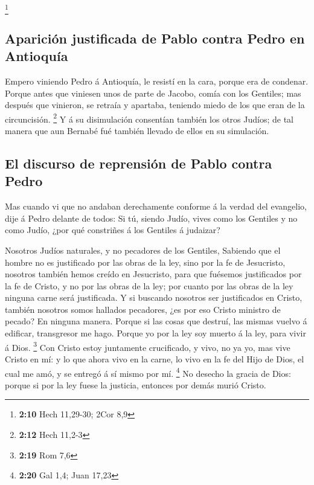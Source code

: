 \footnote{\textbf{2:10} Hech 11,29-30; 2Cor 8,9}

\hypertarget{apariciuxf3n-justificada-de-pablo-contra-pedro-en-antioquuxeda}{%
\subsection{Aparición justificada de Pablo contra Pedro en
Antioquía}\label{apariciuxf3n-justificada-de-pablo-contra-pedro-en-antioquuxeda}}

 Empero viniendo Pedro á Antioquía, le resistí en la cara,
porque era de condenar.  Porque antes que viniesen unos de
parte de Jacobo, comía con los Gentiles; mas después que vinieron, se
retraía y apartaba, teniendo miedo de los que eran de la circuncisión.
\footnote{\textbf{2:12} Hech 11,2-3}  Y á su disimulación
consentían también los otros Judíos; de tal manera que aun Bernabé fué
también llevado de ellos en su simulación.

\hypertarget{el-discurso-de-reprensiuxf3n-de-pablo-contra-pedro}{%
\subsection{El discurso de reprensión de Pablo contra
Pedro}\label{el-discurso-de-reprensiuxf3n-de-pablo-contra-pedro}}

 Mas cuando vi que no andaban derechamente conforme á la
verdad del evangelio, dije á Pedro delante de todos: Si tú, siendo
Judío, vives como los Gentiles y no como Judío, ¿por qué constriñes á
los Gentiles á judaizar?

 Nosotros Judíos naturales, y no pecadores de los Gentiles,
 Sabiendo que el hombre no es justificado por las obras de
la ley, sino por la fe de Jesucristo, nosotros también hemos creído en
Jesucristo, para que fuésemos justificados por la fe de Cristo, y no por
las obras de la ley; por cuanto por las obras de la ley ninguna carne
será justificada.  Y si buscando nosotros ser justificados
en Cristo, también nosotros somos hallados pecadores, ¿es por eso Cristo
ministro de pecado? En ninguna manera.  Porque si las cosas
que destruí, las mismas vuelvo á edificar, transgresor me hago.
 Porque yo por la ley soy muerto á la ley, para vivir á
Dios. \footnote{\textbf{2:19} Rom 7,6}  Con Cristo estoy
juntamente crucificado, y vivo, no ya yo, mas vive Cristo en mí: y lo
que ahora vivo en la carne, lo vivo en la fe del Hijo de Dios, el cual
me amó, y se entregó á sí mismo por mí. \footnote{\textbf{2:20} Gal 1,4;
  Juan 17,23}  No desecho la gracia de Dios: porque si por
la ley fuese la justicia, entonces por demás murió Cristo.

